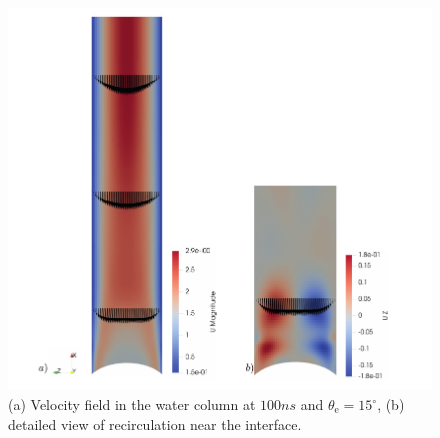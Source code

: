 \begin{figure}[h]
    \centering
    \includegraphics[width=.95\textwidth]{Pictures/Velo_Wedge.pdf}
    \caption{(a) Velocity field in the water column at $100ns$ and $\theta_{\mathrm{e}}=15^{\circ}$, (b) detailed view of recirculation near the interface.}
    \label{fig: Velofield_Wedge}
\end{figure}
